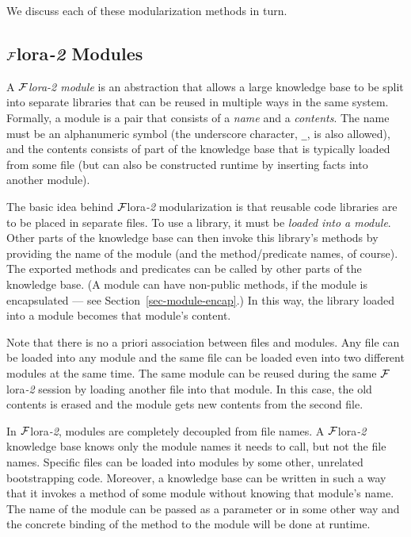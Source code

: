 \documentclass[11pt]{article}
\newcommand{\FLORA}{{\mbox{\sc ${\cal F}${lora}\rm\emph{-2}}}\xspace}
\newcommand{\FLSYSTEM}{\FLORA}
\begin{document}
We discuss each of these modularization methods in turn.


\subsection{\FLSYSTEM Modules} \label{sec:flora-modules}

A \emph{\FLSYSTEM module} is an abstraction that allows a large
knowledge base to be split into separate libraries that can be reused in multiple
ways in the same system. Formally, a module is a pair that consists of a
\emph{name} and a \emph{contents}. The name must be an alphanumeric symbol
(the underscore character, {\tt \_}, is also allowed), and the contents
consists of part of
the knowledge base that is typically loaded from some file (but can also
be constructed runtime by inserting facts
into another module).

The basic idea behind \FLSYSTEM modularization is that reusable code libraries
are to be placed in separate files.  To use a library, it must be
\emph{loaded into a module}. Other parts of the knowledge base can then invoke
this library's methods by providing the name of the module (and the
method/predicate names, of course).  
The exported methods and predicates can be called by other
parts of the knowledge base. (A module can have non-public methods, if the module
is encapsulated ---
see Section~\ref{sec-module-encap}.)
In this way, the library loaded into a module becomes that module's content.

Note that there is no a priori association between files and modules.  Any
file can be loaded into any module and the same file can be loaded even
into two different modules at the same time. The same module can be reused
during the same \FLSYSTEM session by loading another file into that module. In
this case, the old contents is erased and the module gets new contents from
the second file.

In \FLSYSTEM, modules are completely decoupled from file names. A \FLSYSTEM
knowledge base knows only the module names it needs to call, but not the file
names. Specific files can be loaded into modules by some other, unrelated
bootstrapping code. Moreover, a knowledge base can be written in such a way
that it invokes a method of some module without knowing that module's name.
The name of the module can be passed as a parameter or in some other way
and the concrete binding of the method to the module will be done at
runtime.
\end{document}
